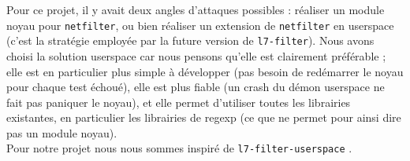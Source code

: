 Pour ce projet, il y avait deux angles d'attaques possibles : réaliser un module noyau pour \verb+netfilter+, ou bien réaliser un extension de \verb+netfilter+ en userspace (c'est la stratégie employée par la future version de \verb+l7-filter+).
Nous avons choisi la solution userspace car nous pensons qu'elle est clairement préférable ; elle est en particulier plus simple à développer (pas besoin de
redémarrer le noyau pour chaque test échoué), elle est plus fiable (un
crash du démon userspace ne fait pas paniquer le noyau), et elle
permet d'utiliser toutes les librairies existantes, en particulier les
librairies de regexp (ce que ne permet pour ainsi dire pas un module
noyau).\\

Pour notre projet nous nous sommes inspiré de \verb+l7-filter-userspace+ \cite{RW}.